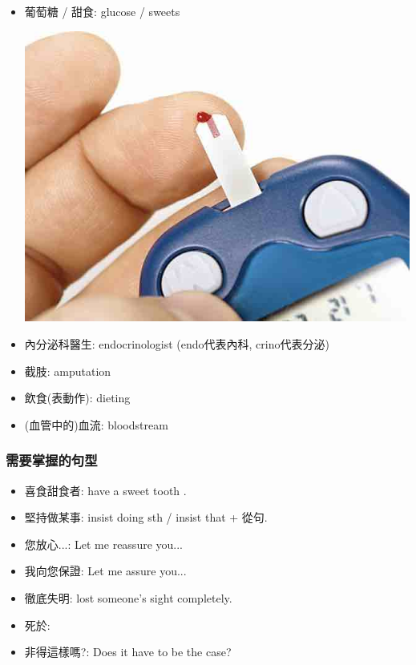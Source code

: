 \begin{itemize}
\begin{center}
  \end{center}
  \item 葡萄糖 / 甜食: glucose / sweets
  \begin{center}
    \includegraphics[scale=.2]{pics/glucose.jpg}
  \end{center}
  \item 內分泌科醫生: endocrinologist (endo代表內科, crino代表分泌)
  \item 截肢: amputation
  \item 飲食(表動作): dieting
  \item (血管中的)血流: bloodstream
\end{itemize}

\subsubsection*{需要掌握的句型}
\begin{itemize}
  \itemsep0em
  \item 喜食甜食者: have a sweet tooth .
  \item 堅持做某事: insist  doing sth / insist that + 從句.
  \item 您放心...: Let me reassure you...
  \item 我向您保證: Let me assure you...
  \item 徹底失明: lost someone's sight completely.
  \item 死於: 
  \item 非得這樣嗎?: Does it have to be the case?
\end{itemize}


